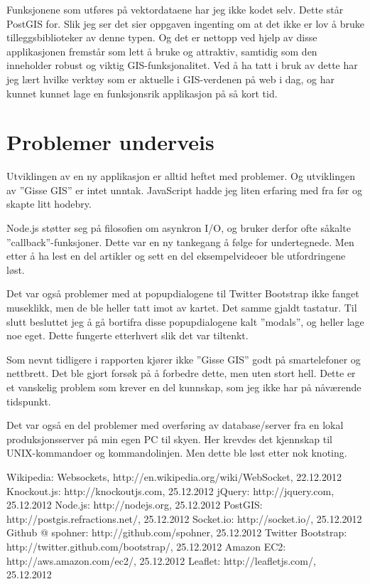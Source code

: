 \documentclass[12pt,twoside,onecolumn]{article}
\begin{document}
	Funksjonene som utføres på vektordataene har jeg ikke kodet selv. Dette står PostGIS for. Slik jeg ser det sier oppgaven ingenting om at det ikke er lov å bruke tilleggsbiblioteker av denne typen. Og det er nettopp ved hjelp av disse applikasjonen fremstår som lett å bruke og attraktiv, samtidig som den inneholder robust og viktig GIS-funksjonalitet. Ved å ha tatt i bruk av dette har jeg lært hvilke verktøy som er aktuelle i GIS-verdenen på web i dag, og har kunnet kunnet lage en funksjonsrik applikasjon på så kort tid.

\section{Problemer underveis}

	Utviklingen av en ny applikasjon er alltid heftet med problemer. Og utviklingen av ''Gisse GIS'' er intet unntak. JavaScript hadde jeg liten erfaring med fra før og skapte litt hodebry. 
	
	Node.js støtter seg på filosofien om asynkron I/O, og bruker derfor ofte såkalte ''callback''-funksjoner. Dette var en ny tankegang å følge for undertegnede. Men etter å ha lest en del artikler og sett en del eksempelvideoer ble utfordringene løst.
	
	Det var også problemer med at popupdialogene til Twitter Bootstrap ikke fanget museklikk, men de ble heller tatt imot av kartet. Det samme gjaldt tastatur. Til slutt besluttet jeg å gå bortifra disse popupdialogene kalt ''modals'', og heller lage noe eget. Dette fungerte etterhvert slik det var tiltenkt.
	
	Som nevnt tidligere i rapporten kjører ikke ''Gisse GIS'' godt på smartelefoner og nettbrett. Det ble gjort forsøk på å forbedre dette, men uten stort hell. Dette er et vanskelig problem som krever en del kunnskap, som jeg ikke har på nåværende tidspunkt.
	
	Det var også en del problemer med overføring av database/server fra en lokal produksjonsserver på min egen PC til skyen. Her krevdes det kjennskap til UNIX-kommandoer og kommandolinjen. Men dette ble løst etter nok knoting.    
	

\newpage
\begin{thebibliography}{9}

	Wikipedia: Websockets, http://en.wikipedia.org/wiki/WebSocket, 22.12.2012
	Knockout.js: http://knockoutjs.com, 25.12.2012
	jQuery: http://jquery.com, 25.12.2012
	Node.js: http://nodejs.org, 25.12.2012
	PostGIS: http://postgis.refractions.net/, 25.12.2012
	Socket.io: http://socket.io/, 25.12.2012
	Github @ spohner: http://github.com/spohner, 25.12.2012
	Twitter Bootstrap: http://twitter.github.com/bootstrap/, 25.12.2012
	Amazon EC2: http://aws.amazon.com/ec2/, 25.12.2012
	Leaflet: http://leafletjs.com/, 25.12.2012

\end{thebibliography}

\listoffigures
\end{document}
